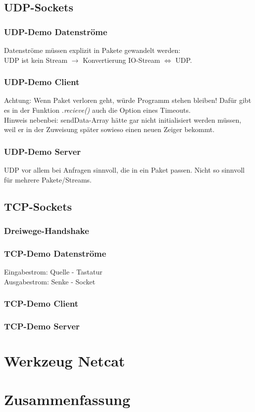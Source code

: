 \subsection{UDP-Sockets}
\subsubsection{UDP-Demo Datenströme}
Datenströme müssen explizit in Pakete gewandelt werden:\\
UDP ist kein Stream $\to$ Konvertierung IO-Stream $\Leftrightarrow$ UDP.
\subsubsection{UDP-Demo Client}
Achtung: Wenn Paket verloren geht, würde Programm stehen bleiben! Dafür gibt es in der Funktion \emph{.recieve()} auch die Option eines Timeouts.\\
Hinweis nebenbei: sendData-Array hätte gar nicht initialisiert werden müssen, weil er in der Zuweisung später sowieso einen neuen Zeiger bekommt.
\subsubsection{UDP-Demo Server}
UDP vor allem bei Anfragen sinnvoll, die in ein Paket passen. Nicht so sinnvoll für mehrere Pakete/Streams.

\subsection{TCP-Sockets}
\subsubsection*{Dreiwege-Handshake}
\subsubsection{TCP-Demo Datenströme}
Eingabestrom: Quelle - Tastatur\\
Ausgabestrom: Senke - Socket
\subsubsection{TCP-Demo Client}
\subsubsection{TCP-Demo Server}

\section{Werkzeug Netcat}

\section*{Zusammenfassung}
